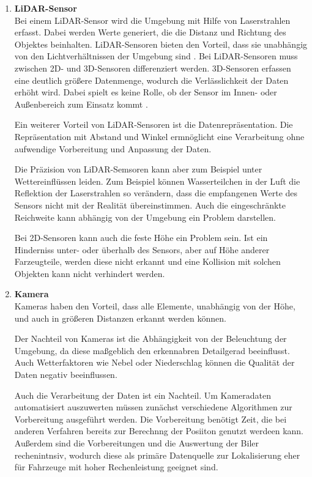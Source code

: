 \begin{enumerate}[leftmargin=*]
    \item \textbf{LiDAR-Sensor} \\
    Bei einem LiDAR-Sensor wird die Umgebung mit Hilfe von Laserstrahlen erfasst.
    Dabei werden Werte generiert, die die Distanz und Richtung des Objektes beinhalten. 
    LiDAR-Sensoren bieten den Vorteil, dass sie unabhängig von den Lichtverhältnissen der Umgebung sind \cite{lidar}. 
    Bei LiDAR-Sensoren muss zwischen 2D- und 3D-Sensoren differenziert werden. 
    3D-Sensoren erfassen eine deutlich größere Datenmenge, wodurch die Verlässlichkeit der Daten erhöht wird.
    Dabei spielt es keine Rolle, ob der Sensor im Innen- oder Außenbereich zum Einsatz kommt \cite{lidar}. 

    Ein weiterer Vorteil von LiDAR-Sensoren ist die Datenrepräsentation.
    Die Repräsentation mit Abstand und Winkel ermnöglicht eine Verarbeitung ohne aufwendige Vorbereitung und Anpassung der Daten.
    
    Die Präzision von LiDAR-Semsoren kann aber zum Beispiel unter Wettereinflüssen leiden. 
    Zum Beispiel können Wasserteilchen in der Luft die Reflektion der Laserstrahlen so verändern, dass die empfangenen Werte des Sensors nicht mit der Realität übereinstimmen.
    Auch die eingeschränkte Reichweite kann abhängig von der Umgebung ein Problem darstellen.

    Bei 2D-Sensoren kann auch die feste Höhe ein Problem sein.
    Ist ein Hinderniss unter- oder überhalb des Sensors, aber auf Höhe anderer Farzeugteile, 
    werden diese nicht erkannt und eine Kollision mit solchen Objekten kann nicht verhindert werden. 

    \item \textbf{Kamera} \\
    Kameras haben den Vorteil, dass alle Elemente, unabhängig von der Höhe, und auch in größeren Distanzen erkannt werden können. 

    Der Nachteil von Kameras ist die Abhängigkeit von der Beleuchtung der Umgebung, da diese maßgeblich den erkennabren Detailgerad beeinflusst.
    Auch Wetterfaktoren wie Nebel oder Niederschlag können die Qualität der Daten negativ beeinflussen.

    Auch die Verarbeitung der Daten ist ein Nachteil. 
    Um Kameradaten automatisiert auszuwerten müssen zunächst verschiedene Algorithmen zur Vorbereitung ausgeführt werden. 
    Die Vorbereitung benötigt Zeit, die bei anderen Verfahren bereits zur Berechnng der Posiiton genutzt werdeen kann.
    Außerdem sind die Vorbereitungen und die Auswertung der Biler rechenintnsiv, 
    wodurch diese als primäre Datenquelle zur Lokalisierung eher für Fahrzeuge mit hoher Rechenleistung geeignet sind.


\end{enumerate}
